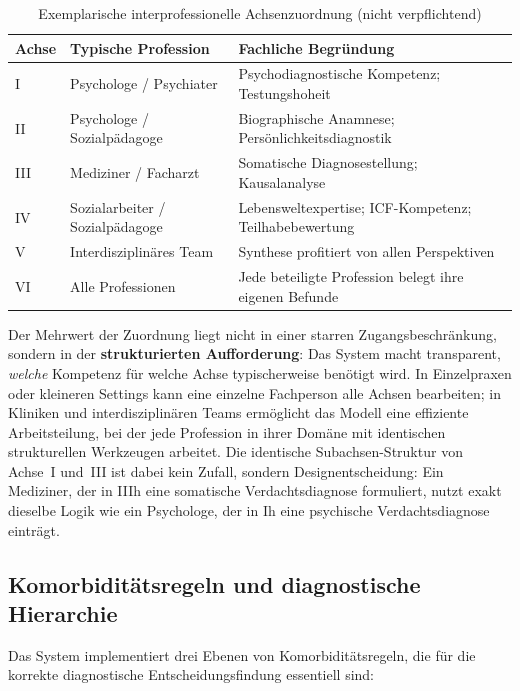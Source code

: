 \documentclass[11pt,a4paper]{article}
\begin{document}
\begin{table}[H]
\centering
\caption{Exemplarische interprofessionelle Achsenzuordnung (nicht verpflichtend)}
\label{tab:professionen}
\begin{tabularx}{\textwidth}{lXX}
\toprule
\textbf{Achse} & \textbf{Typische Profession} & \textbf{Fachliche Begr\"undung} \\
\midrule
I & Psychologe / Psychiater & Psychodiagnostische Kompetenz; Testungshoheit \\
\addlinespace
II & Psychologe / Sozialp\"adagoge & Biographische Anamnese; Pers\"onlichkeitsdiagnostik \\
\addlinespace
III & Mediziner / Facharzt & Somatische Diagnosestellung; Kausalanalyse \\
\addlinespace
IV & Sozialarbeiter / Sozialp\"adagoge & Lebensweltexpertise; ICF-Kompetenz; Teilhabebewertung \\
\addlinespace
V & Interdisziplin\"ares Team & Synthese profitiert von allen Perspektiven \\
\addlinespace
VI & Alle Professionen & Jede beteiligte Profession belegt ihre eigenen Befunde \\
\bottomrule
\end{tabularx}
\end{table}

Der Mehrwert der Zuordnung liegt nicht in einer starren Zugangsbeschr\"ankung, sondern in der \textbf{strukturierten Aufforderung}: Das System macht transparent, \textit{welche} Kompetenz f\"ur welche Achse typischerweise ben\"otigt wird. In Einzelpraxen oder kleineren Settings kann eine einzelne Fachperson alle Achsen bearbeiten; in Kliniken und interdisziplin\"aren Teams erm\"oglicht das Modell eine effiziente Arbeitsteilung, bei der jede Profession in ihrer Dom\"ane mit identischen strukturellen Werkzeugen arbeitet. Die identische Subachsen-Struktur von Achse~I und~III ist dabei kein Zufall, sondern Designentscheidung: Ein Mediziner, der in IIIh eine somatische Verdachtsdiagnose formuliert, nutzt exakt dieselbe Logik wie ein Psychologe, der in Ih eine psychische Verdachtsdiagnose eintr\"agt.

\subsection{Komorbidit\"atsregeln und diagnostische Hierarchie}
\label{sec:komorbiditaet}

Das System implementiert drei Ebenen von Komorbidit\"atsregeln, die f\"ur die korrekte diagnostische Entscheidungsfindung essentiell sind:
\end{document}
